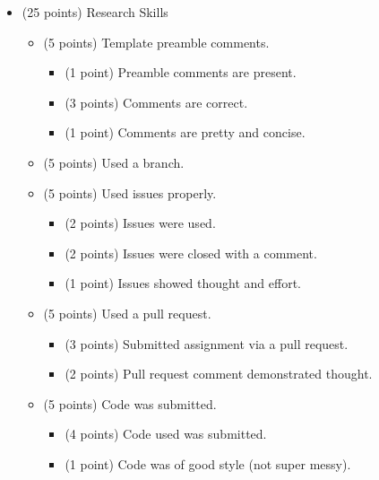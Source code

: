 \documentclass[12pt]{article}
\begin{document}
\begin{itemize}
\begin{itemize}
\begin{itemize}
		\end{itemize}
	\end{itemize}
	\item (25 points) Research Skills
	\begin{itemize}
	\item (5 points) Template preamble comments.
	\begin{itemize}
		\item (1 point) Preamble comments are present.
		\item (3 points) Comments are correct.
		\item (1 point) Comments are pretty and concise.
	\end{itemize}
	\item (5 points) Used a branch.
	\item (5 points) Used issues properly.
		\begin{itemize}
		\item (2 points) Issues were used.
		\item (2 points) Issues were closed with a comment.
		\item (1 point) Issues showed thought and effort.
	\end{itemize}
	\item (5 points) Used a pull request.
		\begin{itemize}
		\item (3 points) Submitted assignment via a pull request.
		\item (2 points) Pull request comment demonstrated thought. 
	\end{itemize}
	\item (5 points) Code was submitted.
		\begin{itemize}
		\item (4 points) Code used was submitted.
		\item (1 point) Code was of good style (not super messy). 
	\end{itemize}
	\end{itemize}
\end{itemize}



	
	

	
	
	
	
	
	
\end{document}

